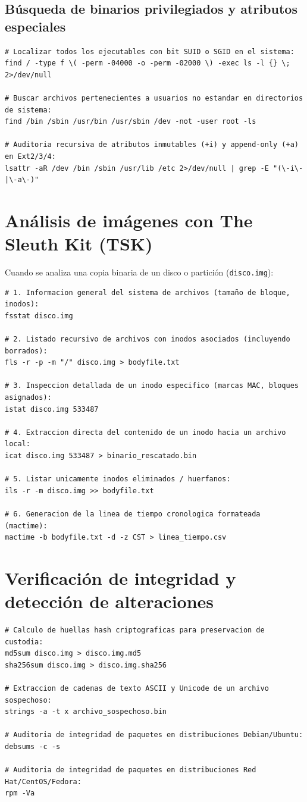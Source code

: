 \subsection{Búsqueda de binarios privilegiados y atributos especiales}
\begin{lstlisting}[style=terminal]
# Localizar todos los ejecutables con bit SUID o SGID en el sistema:
find / -type f \( -perm -04000 -o -perm -02000 \) -exec ls -l {} \; 2>/dev/null

# Buscar archivos pertenecientes a usuarios no estandar en directorios de sistema:
find /bin /sbin /usr/bin /usr/sbin /dev -not -user root -ls

# Auditoria recursiva de atributos inmutables (+i) y append-only (+a) en Ext2/3/4:
lsattr -aR /dev /bin /sbin /usr/lib /etc 2>/dev/null | grep -E "(\-i\-|\-a\-)"
\end{lstlisting}

\section{Análisis de imágenes con The Sleuth Kit (TSK)}

Cuando se analiza una copia binaria de un disco o partición (\texttt{disco.img}):

\begin{lstlisting}[style=terminal]
# 1. Informacion general del sistema de archivos (tamaño de bloque, inodos):
fsstat disco.img

# 2. Listado recursivo de archivos con inodos asociados (incluyendo borrados):
fls -r -p -m "/" disco.img > bodyfile.txt

# 3. Inspeccion detallada de un inodo especifico (marcas MAC, bloques asignados):
istat disco.img 533487

# 4. Extraccion directa del contenido de un inodo hacia un archivo local:
icat disco.img 533487 > binario_rescatado.bin

# 5. Listar unicamente inodos eliminados / huerfanos:
ils -r -m disco.img >> bodyfile.txt

# 6. Generacion de la linea de tiempo cronologica formateada (mactime):
mactime -b bodyfile.txt -d -z CST > linea_tiempo.csv
\end{lstlisting}

\section{Verificación de integridad y detección de alteraciones}

\begin{lstlisting}[style=terminal]
# Calculo de huellas hash criptograficas para preservacion de custodia:
md5sum disco.img > disco.img.md5
sha256sum disco.img > disco.img.sha256

# Extraccion de cadenas de texto ASCII y Unicode de un archivo sospechoso:
strings -a -t x archivo_sospechoso.bin

# Auditoria de integridad de paquetes en distribuciones Debian/Ubuntu:
debsums -c -s

# Auditoria de integridad de paquetes en distribuciones Red Hat/CentOS/Fedora:
rpm -Va
\end{lstlisting}
